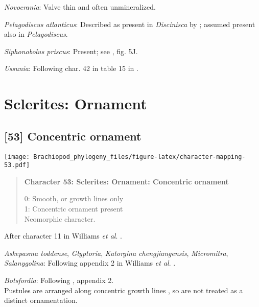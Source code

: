 \documentclass[openany]{book}
\theoremstyle{definition}
\theoremstyle{definition}
\theoremstyle{definition}
\theoremstyle{remark}
\begin{document}
\hypertarget{Novocrania-coding-52}{}
\emph{Novocrania}: Valve thin and often unmineralized.

\hypertarget{Pelagodiscus_atlanticus-coding-52}{}
\emph{Pelagodiscus atlanticus}: Described as present in
\emph{Discinisca} by \citet{Chen2007Reinterpretationof}; assumed present
also in \emph{Pelagodiscus}.

\hypertarget{Siphonobolus_priscus-coding-52}{}
\emph{Siphonobolus priscus}: Present; see
\citet{Popov2009Earlyontogeny}, fig. 5J.

\hypertarget{Ussunia-coding-52}{}
\emph{Ussunia}: Following char. 42 in table 15 in
\citet{Williams2000LinguliformeaCraniiformea}.

\section{Sclerites: Ornament}\label{sclerites-ornament}

\subsection*{{[}53{]} Concentric ornament}\label{concentric-ornament}

\texttt{[image: Brachiopod\_phylogeny\_files/figure-latex/character-mapping-53.pdf]}

\begin{quote}
\textbf{Character 53: Sclerites: Ornament: Concentric ornament}

0: Smooth, or growth lines only\\
1: Concentric ornament present\\
Neomorphic character.
\end{quote}

After character 11 in Williams \emph{et al}.
\citeyearpar{Williams1998Thediversity}.

\hypertarget{Askepasma_toddense-coding-53}{}
\emph{Askepasma toddense}, \emph{Glyptoria}, \emph{Kutorgina
chengjiangensis}, \emph{Micromitra}, \emph{Salanygolina}: Following
appendix 2 in Williams \emph{et al}.
\citeyearpar{Williams1998Thediversity}.

\hypertarget{Botsfordia-coding-53}{}
\emph{Botsfordia}: Following \citet{Williams1998Thediversity}, appendix
2.\\
Pustules are arranged along concentric growth lines
\citep{Skovsted2005EarlyCambrian}, so are not treated as a distinct
ornamentation.
\end{document}
